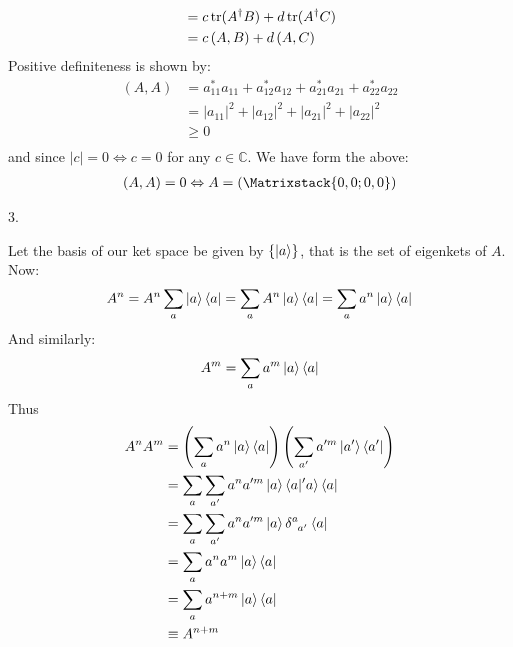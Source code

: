 \documentclass[a4paper,12pt]{article}
\newcommand\rbm[1]{\left(\Matrixstack{#1}\right)}
\begin{document}
\begin{minipage}[t]{\textwidth}
\begin{minipage}[t]{\textwidth}
\begin{align*}
                    &= c\trace(A^\dagger B) + d\trace(A^\dagger C)\\
                    &= c\left(A, B\right) + d\left(A, C\right)
    \end{align*}
    Positive definiteness is shown by:
    \begin{align*}
      \left(A , A \right) &= a_{11}^*a_{11} + a_{12}^*a_{12} + a_{21}^*a_{21} + a_{22}^*a_{22}\\
                          &= |a_{11}|^2 + |a_{12}|^2 + |a_{21}|^2 + |a_{22}|^2\\
                          & \geq 0\\
    \end{align*}
    and since $|c| = 0 \Leftrightarrow c = 0$ for any $c \in \mathbb{C}$.
    We have form the above:
    \begin{align*}
      \left(A , A \right) = 0 \Leftrightarrow A = \rbm{0, 0; 0,0}
    \end{align*}
  \end{minipage}
\end{minipage}

3.
\begin{minipage}[t]{0.9\textwidth}
  \begin{minipage}[t]{\textwidth}
    Let the basis of our ket space be given by $\left\{\ket{a}\right\}$, that is the set of eigenkets of $A$.
    Now:
    \begin{equation*}
      A^n = A^n\sum_a \ket{a}\bra{a} = \sum_a A^n\ket{a}\bra{a} = \sum_a a^n\ket{a}\bra{a}
    \end{equation*}
    And similarly:
    \begin{equation*}
      A^m = \sum_a a^m\ket{a}\bra{a}
    \end{equation*}
    Thus
    \begin{align*}
      A^nA^m &= \left(\sum_a a^n\ket{a}\bra{a}\right)\left(\sum_{a'} a'^m\ket{a'}\bra{a'}\right)\\
             &= \sum_a \sum_{a'} a^na'^m\ket{a}\braket{a | 'a}\bra{a}\\
             &= \sum_a \sum_{a'} a^na'^m\ket{a}\tensor{\delta}{^a_{a'}}\bra{a}\\
             &= \sum_a a^na^m\ket{a}\bra{a}\\
             &= \sum_a a^{n + m}\ket{a}\bra{a}\\
             &\equiv A^{n + m}
    \end{align*}
  \end{minipage}
\end{minipage}
\end{document}
